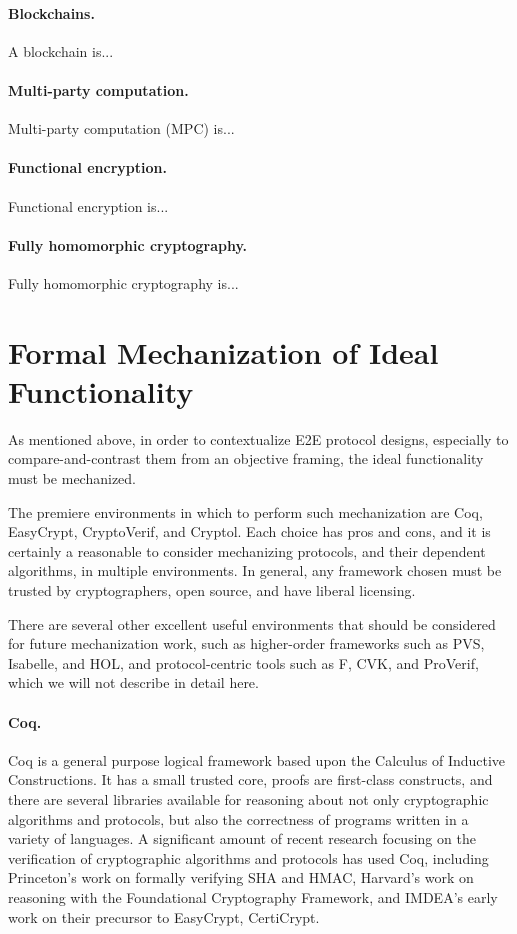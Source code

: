 \paragraph{Blockchains.} A blockchain is...

\paragraph{Multi-party computation.} Multi-party computation (MPC) is...

\paragraph{Functional encryption.} Functional encryption is...

\paragraph{Fully homomorphic cryptography.} Fully homomorphic
cryptography is...

\section{Formal Mechanization of Ideal Functionality}

As mentioned above, in order to contextualize E2E protocol designs,
especially to compare-and-contrast them from an objective framing, the
ideal functionality must be mechanized.

The premiere environments in which to perform such mechanization are
Coq, EasyCrypt, CryptoVerif, and Cryptol. Each choice has pros and
cons, and it is certainly a reasonable to consider mechanizing
protocols, and their dependent algorithms, in multiple environments.
In general, any framework chosen must be trusted by cryptographers,
open source, and have liberal licensing.

There are several other excellent useful environments that should be
considered for future mechanization work, such as higher-order
frameworks such as PVS, Isabelle, and HOL, and protocol-centric tools
such as F\*, CVK, and ProVerif, which we will not describe in detail
here.

\paragraph{Coq.} Coq is a general purpose logical framework based upon
the Calculus of Inductive Constructions. It has a small trusted core,
proofs are first-class constructs, and there are several libraries
available for reasoning about not only cryptographic algorithms and
protocols, but also the correctness of programs written in a variety
of languages. A significant amount of recent research focusing on the
verification of cryptographic algorithms and protocols has used Coq,
including Princeton's work on formally verifying SHA and HMAC,
Harvard's work on reasoning with the Foundational Cryptography
Framework, and IMDEA's early work on their precursor to EasyCrypt,
CertiCrypt.

